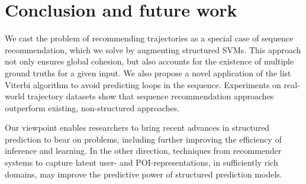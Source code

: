
\section{Conclusion and future work}

We cast the problem of recommending trajectories as a special case of sequence recommendation,
which we solve by augmenting structured SVMs.
This approach not only ensures global cohesion, but also accounts for the existence of multiple ground truths for a given input.
We also propose a novel application of the list Viterbi algorithm to avoid predicting loops in the sequence.
Experiments on real-world trajectory datasets show that
sequence recommendation approaches outperform existing, non-structured approaches.

%
%

Our viewpoint enables researchers to bring recent advances in structured prediction
to bear on {\trajrec} problems,
including further improving the efficiency of inference and learning.
In the other direction, techniques from recommender systems to capture latent
user- and POI-representations, in sufficiently rich domains, may
improve the predictive power of structured prediction models.

